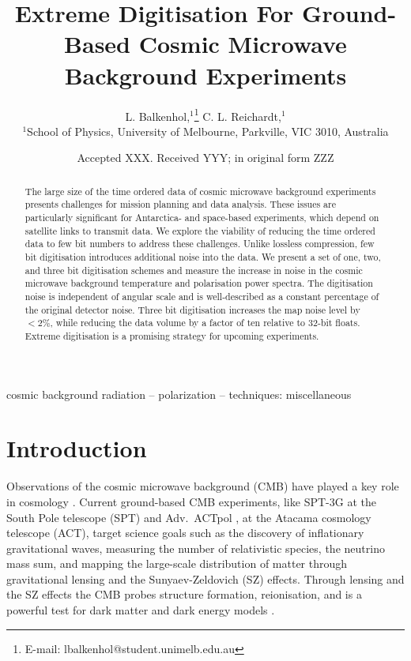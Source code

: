 \documentclass[a4paper,fleqn,usenatbib]{mnras}
\title[Short title, max. 45 characters]{Extreme Digitisation For Ground-Based Cosmic Microwave Background Experiments}
\author[L. Balkenhol and C. L. Reichardt.]{
L. Balkenhol,$^{1}$\thanks{E-mail: lbalkenhol@student.unimelb.edu.au}
C. L. Reichardt,$^{1}$
\\
$^{1}$School of Physics, University of Melbourne, Parkville, VIC 3010, Australia\\
}
\date{Accepted XXX. Received YYY; in original form ZZZ}
\newcommand{\sptnew}{SPT-3G }
\newcommand{\advactpol}{Adv.~ACTpol }
\begin{document}
\label{firstpage}
\pagerange{\pageref{firstpage}--\pageref{lastpage}}
\maketitle

\begin{abstract}
The large size of the time ordered data of cosmic microwave background experiments presents challenges for mission planning and data analysis. These issues are particularly significant for Antarctica- and space-based experiments, which depend on satellite links to transmit data. We explore the viability of reducing the time ordered data to few bit numbers to address these challenges. Unlike lossless compression, few bit digitisation introduces additional noise into the data. We present a set of one, two, and three bit digitisation schemes and measure the increase in noise in the cosmic microwave background temperature and polarisation power spectra. The digitisation noise is independent of angular scale and is well-described as a constant percentage of the original detector noise. Three bit digitisation increases the map noise level by $< 2\%$, while reducing the data volume by a factor of ten relative to 32-bit floats. Extreme digitisation is a promising strategy for upcoming experiments.
\end{abstract}

\begin{keywords}
cosmic background radiation -- polarization -- techniques: miscellaneous
\end{keywords}



\section{Introduction}
\label{sec:intro}

Observations of the cosmic microwave background (CMB) have played a key role in cosmology \citep{penzias1965, smoot1992, bennett2013, sptpol2013, planck2018}. Current ground-based CMB experiments, like \sptnew \citep{benson2014} at the South Pole telescope (SPT) and \advactpol \citep{thornton2016}, at the Atacama cosmology telescope (ACT), target science goals such as the discovery of inflationary gravitational waves, measuring the number of relativistic species, the neutrino mass sum, and mapping the large-scale distribution of matter through gravitational lensing and the Sunyaev-Zeldovich (SZ) effects. Through lensing and the SZ effects the CMB probes structure formation, reionisation, and is a powerful test for dark matter and dark energy models \citep{s4sciencebook, 2018corecos, litebird2016, pixie2011}.
\end{document}
